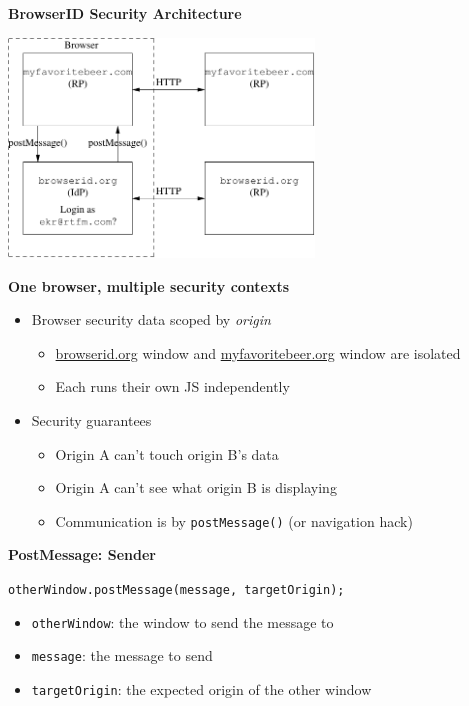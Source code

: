 \documentclass[helvetica]{seminar}
\newcommand{\heading}[1]{%
  \begin{center} 
    \large\bf 
    #1 
  \end{center} 
  \vspace{.4 in}}
\begin{document}
\begin{slide}
\heading{BrowserID Security Architecture}

\begin{center}
\includegraphics[width=3.2in]{browserid-arch}
\end{center}

\end{slide}


\begin{slide}
\heading{One browser, multiple security contexts}

\begin{itemize}
\item Browser security data scoped by \emph{origin}
  \begin{itemize}
  \item \url{browserid.org} window and \url{myfavoritebeer.org} window are isolated
  \item Each runs their own JS independently
  \end{itemize}

\item Security guarantees
  \begin{itemize}
  \item Origin A can't touch origin B's data
  \item Origin A can't see what origin B is displaying
  \item Communication is by \verb^postMessage()^ (or navigation hack)
  \end{itemize}
\end{itemize}
\end{slide}


\begin{slide}
\heading{PostMessage: Sender}

\verb^otherWindow.postMessage(message, targetOrigin);^

\begin{itemize}
\item[] \verb^otherWindow^: the window to send the message to
\item[] \verb^message^: the message to send
\item[] \verb^targetOrigin^: the expected origin of the other window
\end{itemize}
\end{slide}
\end{document}
